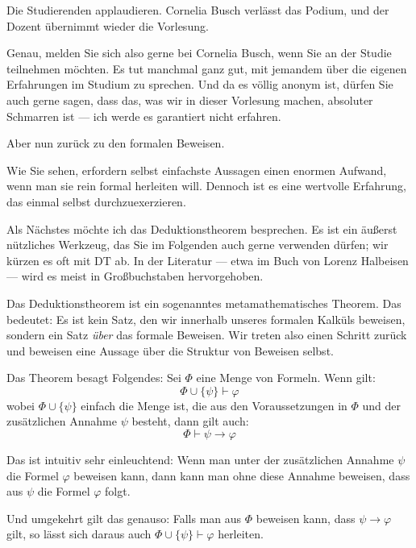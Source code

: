 \begin{meta-note}
Die Studierenden applaudieren. Cornelia Busch verlässt das Podium, und der Dozent übernimmt wieder die Vorlesung.
\end{meta-note}

\begin{spoken-clean}[00:46:52 - 00:48:34]
Genau, melden Sie sich also gerne bei Cornelia Busch, wenn Sie an der Studie teilnehmen möchten. Es tut manchmal ganz gut, mit jemandem über die eigenen Erfahrungen im Studium zu sprechen. Und da es völlig anonym ist, dürfen Sie auch gerne sagen, dass das, was wir in dieser Vorlesung machen, absoluter Schmarren ist --- ich werde es garantiert nicht erfahren. 

Aber nun zurück zu den formalen Beweisen. 

Wie Sie sehen, erfordern selbst einfachste Aussagen einen enormen Aufwand, wenn man sie rein formal herleiten will. Dennoch ist es eine wertvolle Erfahrung, das einmal selbst durchzuexerzieren. 

Als Nächstes möchte ich das Deduktionstheorem besprechen. Es ist ein äußerst nützliches Werkzeug, das Sie im Folgenden auch gerne verwenden dürfen; wir kürzen es oft mit $\text{DT}$ ab. In der Literatur --- etwa im Buch von Lorenz Halbeisen --- wird es meist in Großbuchstaben hervorgehoben. 

Das Deduktionstheorem ist ein sogenanntes metamathematisches Theorem. Das bedeutet: Es ist kein Satz, den wir innerhalb unseres formalen Kalküls beweisen, sondern ein Satz \emph{über} das formale Beweisen. Wir treten also einen Schritt zurück und beweisen eine Aussage über die Struktur von Beweisen selbst.
\end{spoken-clean}

\begin{spoken-clean}[00:48:34 - 00:50:34]
Das Theorem besagt Folgendes: Sei $\Phi$ eine Menge von Formeln. Wenn gilt:
\[ \Phi \cup \{\psi\} \vdash \varphi \]
wobei $\Phi \cup \{\psi\}$ einfach die Menge ist, die aus den Voraussetzungen in $\Phi$ und der zusätzlichen Annahme $\psi$ besteht, dann gilt auch:
\[ \Phi \vdash \psi \rightarrow \varphi \]

Das ist intuitiv sehr einleuchtend: Wenn man unter der zusätzlichen Annahme $\psi$ die Formel $\varphi$ beweisen kann, dann kann man ohne diese Annahme beweisen, dass aus $\psi$ die Formel $\varphi$ folgt. 

Und umgekehrt gilt das genauso: Falls man aus $\Phi$ beweisen kann, dass $\psi \rightarrow \varphi$ gilt, so lässt sich daraus auch $\Phi \cup \{\psi\} \vdash \varphi$ herleiten.
\end{spoken-clean}

